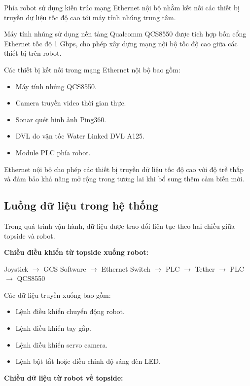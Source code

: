\documentclass[../DoAn.tex]{subfiles}
\begin{document}
Phía robot sử dụng kiến trúc mạng Ethernet nội bộ nhằm kết nối các thiết bị truyền dữ liệu tốc độ cao tới máy tính nhúng trung tâm.

Máy tính nhúng sử dụng nền tảng 
Qualcomm QCS8550
 được tích hợp bốn cổng Ethernet tốc độ 1 Gbps, cho phép xây dựng mạng nội bộ tốc độ cao giữa các thiết bị trên robot.

Các thiết bị kết nối trong mạng Ethernet nội bộ bao gồm:

\begin{itemize}
    \item Máy tính nhúng QCS8550.
    \item Camera truyền video thời gian thực.
    \item Sonar quét hình ảnh 
    Ping360.
    \item DVL đo vận tốc 
    Water Linked DVL A125.
    \item Module PLC phía robot.
\end{itemize}

Ethernet nội bộ cho phép các thiết bị truyền dữ liệu tốc độ cao với độ trễ thấp và đảm bảo khả năng mở rộng trong tương lai khi bổ sung thêm cảm biến mới.

\subsection{Luồng dữ liệu trong hệ thống}

Trong quá trình vận hành, dữ liệu được trao đổi liên tục theo hai chiều giữa topside và robot.

\textbf{Chiều điều khiển từ topside xuống robot:}

\begin{center}
Joystick $\rightarrow$ GCS Software $\rightarrow$ Ethernet Switch $\rightarrow$ PLC $\rightarrow$ Tether $\rightarrow$ PLC $\rightarrow$ QCS8550
\end{center}

Các dữ liệu truyền xuống bao gồm:

\begin{itemize}
    \item Lệnh điều khiển chuyển động robot.
    \item Lệnh điều khiển tay gắp.
    \item Lệnh điều khiển servo camera.
    \item Lệnh bật tắt hoặc điều chỉnh độ sáng đèn LED.
\end{itemize}

\textbf{Chiều dữ liệu từ robot về topside:}
\end{document}
